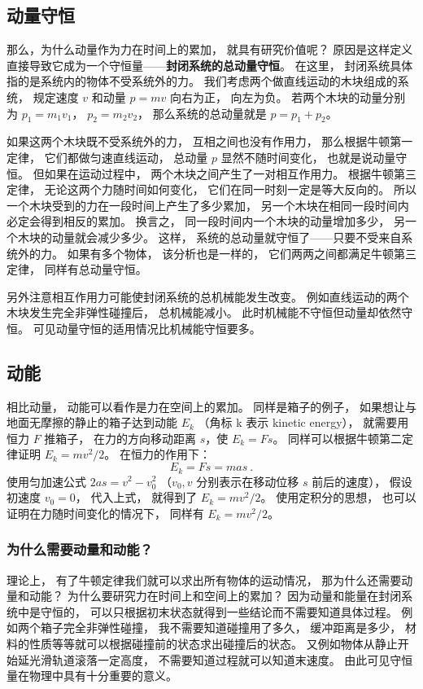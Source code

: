\subsection{动量守恒}
那么，为什么动量作为力在时间上的累加， 就具有研究价值呢？ 原因是这样定义直接导致它成为一个守恒量——\textbf{封闭系统的总动量守恒}。 在这里， 封闭系统具体指的是系统内的物体不受系统外的力。 我们考虑两个做直线运动的木块组成的系统， 规定速度 $v$ 和动量 $p = mv$ 向右为正， 向左为负。 若两个木块的动量分别为 $p_1 = m_1 v_1$， $p_2 = m_2 v_2$， 那么系统的总动量就是 $p = p_1 + p_2$。

如果这两个木块既不受系统外的力， 互相之间也没有作用力， 那么根据牛顿第一定律， 它们都做匀速直线运动， 总动量 $p$ 显然不随时间变化， 也就是说动量守恒。 但如果在运动过程中， 两个木块之间产生了一对相互作用力。 根据牛顿第三定律， 无论这两个力随时间如何变化， 它们在同一时刻一定是等大反向的。 所以一个木块受到的力在一段时间上产生了多少累加， 另一个木块在相同一段时间内必定会得到相反的累加。 换言之， 同一段时间内一个木块的动量增加多少， 另一个木块的动量就会减少多少。 这样， 系统的总动量就守恒了——只要不受来自系统外的力。 如果有多个物体， 该分析也是一样的， 它们两两之间都满足牛顿第三定律， 同样有总动量守恒。

另外注意相互作用力可能使封闭系统的总机械能发生改变。 例如直线运动的两个木块发生完全非弹性碰撞后， 总机械能减小。 此时机械能不守恒但动量却依然守恒。 可见动量守恒的适用情况比机械能守恒要多。

\subsection{动能}
相比动量， 动能可以看作是力在空间上的累加。 同样是箱子的例子， 如果想让与地面无摩擦的静止的箱子达到动能 $E_k$ （角标 k 表示 kinetic energy）， 就需要用恒力 $F$ 推箱子， 在力的方向移动距离 $s$，使 $E_k = Fs$。 同样可以根据牛顿第二定律证明 $E_k = mv^2/2$。 在恒力的作用下：
\begin{equation}
E_k = Fs = mas~.
\end{equation}
使用匀加速公式 $2as = v^2 - v_0^2$ （$v_0, v$ 分别表示在移动位移 $s$ 前后的速度）， 假设初速度 $v_0 = 0$， 代入上式， 就得到了 $E_k = mv^2/2$。 使用定积分的思想， 也可以证明在力随时间变化的情况下， 同样有 $E_k = mv^2/2$。

\subsubsection{为什么需要动量和动能？}
理论上， 有了牛顿定律我们就可以求出所有物体的运动情况， 那为什么还需要动量和动能？ 为什么要研究力在时间上和空间上的累加？ 因为动量和能量在封闭系统中是守恒的， 可以只根据初末状态就得到一些结论而不需要知道具体过程。 例如两个箱子完全非弹性碰撞， 我不需要知道碰撞用了多久， 缓冲距离是多少， 材料的性质等等就可以根据碰撞前的状态求出碰撞后的状态。 又例如物体从静止开始延光滑轨道滚落一定高度， 不需要知道过程就可以知道末速度。 由此可见守恒量在物理中具有十分重要的意义。

